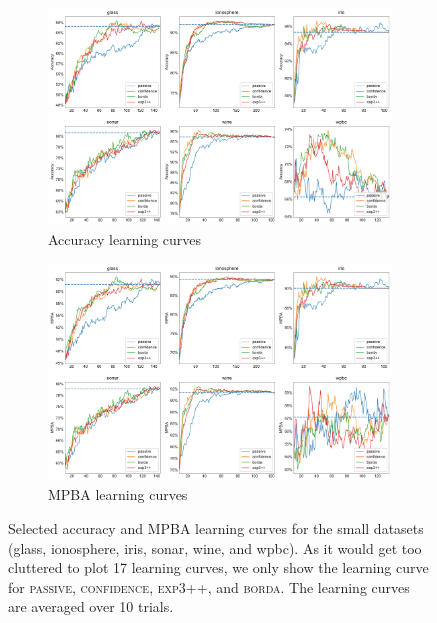 \documentclass[fleqn,10pt,lineno]{wlpeerj} %
\begin{document}
\begin{figure}[tbp]
	\centering
	\begin{subfigure}[t]{\textwidth}
        \centering
        \includegraphics[width=\textwidth]{figures/learning_curves-accuracy-small}
		\caption{Accuracy learning curves}
		\label{fig:learning_curves-accuracy-small}
	\end{subfigure}
	\begin{subfigure}[t]{\textwidth}
        \centering
        \includegraphics[width=\textwidth]{figures/learning_curves-mpba-small}
		\caption{MPBA learning curves}
		\label{fig:learning_curves-accuracy-large}
    \end{subfigure}
	\caption[Selected learning curves]{Selected accuracy and MPBA learning
	curves for the small datasets (glass, ionosphere, iris, sonar, wine, and
	wpbc). As it would get too cluttered to plot 17 learning curves, we only
	show the learning curve for \textsc{passive}, \textsc{confidence},
	\textsc{exp3++}, and \textsc{borda}. The learning curves are averaged over
	10 trials.}
	\label{fig:learning_curves-small}
\end{figure}
\end{document}
